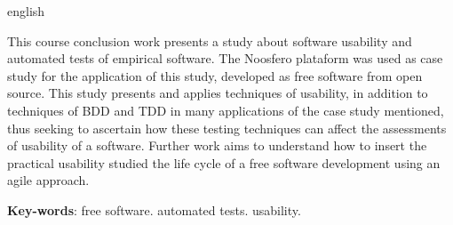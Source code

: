 \begin{resumo}[Abstract]
  \begin{otherlanguage*}{english}  
  
  	This course conclusion work presents a study about software usability and automated tests of empirical software. The Noosfero plataform was used as case study for the application of this study, developed as free software from open source. This study presents and applies techniques of usability, in addition to techniques of BDD and TDD in many applications of the case study mentioned, thus seeking to ascertain how these testing techniques can affect the assessments of usability of a software. Further work aims to understand how to insert the practical usability studied the life cycle of a free software development using an agile approach.
 
   \vspace{\onelineskip}
 
  \noindent 
  \textbf{Key-words}: free software. automated tests. usability.
  \end{otherlanguage*}
\end{resumo}
